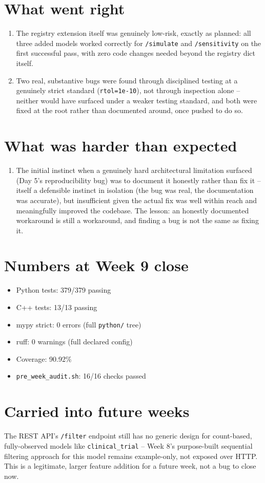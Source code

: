 \documentclass[11pt]{article}
\begin{document}
\section*{What went right}
\begin{enumerate}[leftmargin=*]
  \item The registry extension itself was genuinely low-risk, exactly
    as planned: all three added models worked correctly for
    \texttt{/simulate} and \texttt{/sensitivity} on the first
    successful pass, with zero code changes needed beyond the
    registry dict itself.
  \item Two real, substantive bugs were found through disciplined
    testing at a genuinely strict standard (\texttt{rtol=1e-10}), not
    through inspection alone -- neither would have surfaced under a
    weaker testing standard, and both were fixed at the root rather
    than documented around, once pushed to do so.
\end{enumerate}

\section*{What was harder than expected}
\begin{enumerate}[leftmargin=*]
  \item The initial instinct when a genuinely hard architectural
    limitation surfaced (Day 5's reproducibility bug) was to document
    it honestly rather than fix it -- itself a defensible instinct in
    isolation (the bug was real, the documentation was accurate), but
    insufficient given the actual fix was well within reach and
    meaningfully improved the codebase. The lesson: an honestly
    documented workaround is still a workaround, and finding a bug
    is not the same as fixing it.
\end{enumerate}

\section*{Numbers at Week 9 close}
\begin{itemize}[leftmargin=*]
  \item Python tests: 379/379 passing
  \item C++ tests: 13/13 passing
  \item mypy strict: 0 errors (full \texttt{python/} tree)
  \item ruff: 0 warnings (full declared config)
  \item Coverage: 90.92\%
  \item \texttt{pre\_week\_audit.sh}: 16/16 checks passed
\end{itemize}

\section*{Carried into future weeks}
The REST API's \texttt{/filter} endpoint still has no generic design
for count-based, fully-observed models like
\texttt{clinical\_trial} -- Week 8's purpose-built sequential
filtering approach for this model remains example-only, not exposed
over HTTP. This is a legitimate, larger feature addition for a future
week, not a bug to close now.
\end{document}
